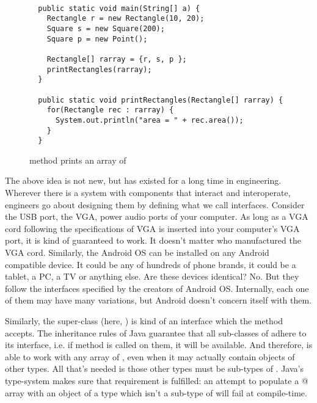 \documentclass[12pt,a4paper]{article}
\begin{document}
\begin{figure}[H]
\begin{lstlisting}[frame=single]

  public static void main(String[] a) {
    Rectangle r = new Rectangle(10, 20);
    Square s = new Square(200);
    Square p = new Point();

    Rectangle[] rarray = {r, s, p };
    printRectangles(rarray);    
  }

  public static void printRectangles(Rectangle[] rarray) {
    for(Rectangle rec : rarray) {
      System.out.println("area = " + rec.area());	
    }    
  }

\end{lstlisting}
\caption{\lstinline@printRectangles@ method prints an array of \lstinline@Rectangle@s}
\label{f:poly2}
\end{figure}

The above idea is not new, but has existed for a long time in engineering. Wherever there is a system with components that interact and interoperate, engineers go about designing them by defining what we call interfaces. Consider the USB port, the VGA, power audio ports of your computer. As long as a VGA cord following the specifications of VGA is inserted into your computer's VGA port, it is kind of guaranteed to work. It doesn't matter who manufactured the VGA cord. Similarly, the Android OS can be installed on any Android compatible device. It could be any of hundreds of phone brands, it could be a tablet, a PC, a TV or anything else. Are these devices identical? No. But they follow the interfaces specified by the creators of Android OS. Internally, each one of them may have many variations, but Android doesn't concern itself with them.

Similarly, the super-class (here, \lstinline@Rectangle@) is kind of an interface which the \lstinline@printRectangles@ method accepts. The inheritance rules of Java guarantee that all sub-classes of \lstinline@Rectangle@ adhere to its interface, i.e. if \lstinline@area@ method is called on them, it will be available. And therefore, \lstinline@printRectangle@ is able to work with any array of \lstinline@Rectangle@s, even when it may actually contain objects of other types. All that's needed is those other types must be sub-types of \lstinline@Rectangle@. Java's type-system makes sure that requirement is fulfilled: an attempt to populate a \lstinline@Rectangle[]@ array with an object of a type which isn't a sub-type of \lstinline@Rectangle@ will fail at compile-time.
\end{document}
